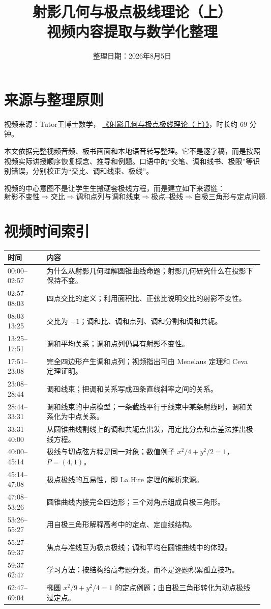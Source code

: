 \documentclass[UTF8,11pt]{ctexart}
\title{射影几何与极点极线理论（上）\\视频内容提取与数学化整理}
\author{}
\date{整理日期：2026年8月5日}
\begin{document}
\maketitle

\section*{来源与整理原则}

\noindent 视频来源：Tutor王博士数学，
\href{https://www.bilibili.com/video/BV1Me411o7ku}
{《射影几何与极点极线理论（上）》}，时长约 $69$ 分钟。

本文依据完整视频音频、板书画面和本地语音转写整理。它不是逐字稿，而是按照视频实际讲授顺序恢复概念、推导和例题。口语中的“交笔、调和线书、极限”等识别错误，分别校正为“交比、调和线束、极线”。

视频的中心意图不是让学生生搬硬套极线方程，而是建立如下来源链：
\[
\boxed{\text{射影不变性}}
\Longrightarrow
\boxed{\text{交比}}
\Longrightarrow
\boxed{\text{调和点列与调和线束}}
\Longrightarrow
\boxed{\text{极点--极线}}
\Longrightarrow
\boxed{\text{自极三角形与定点问题}}.
\]

\section{视频时间索引}

\begin{longtable}{>{\ttfamily\small}p{2.7cm}p{11.0cm}}
\toprule
时间 & 内容 \\
\midrule
00:00--02:57 & 为什么从射影几何理解圆锥曲线命题；射影几何研究什么在投影下保持不变。\\
02:57--08:03 & 四点交比的定义；利用面积比、正弦比说明交比的射影不变性。\\
08:03--13:25 & 交比为 $-1$；调和比、调和点列、调和分割和调和共轭。\\
13:25--17:51 & 调和平均关系；调和点列仍具有射影不变性。\\
17:51--23:08 & 完全四边形产生调和点列；视频指出可由 Menelaus 定理和 Ceva 定理证明。\\
23:08--28:44 & 调和线束；把调和关系写成四条直线斜率之间的关系。\\
28:44--33:31 & 调和线束的中点模型；一条截线平行于线束中某条射线时，调和关系化为中点关系。\\
33:31--40:00 & 从圆锥曲线割线上的调和共轭点出发，用定比分点和点差法推出极线方程。\\
40:00--45:14 & 极线与切点弦方程是同一对象；数值例子 $x^2/4+y^2/2=1$，$P=(4,1)$。\\
45:14--47:08 & 极点极线的互易性，即 La Hire 定理的解析来源。\\
47:08--53:26 & 圆锥曲线内接完全四边形；三个对角点组成自极三角形。\\
53:26--55:27 & 用自极三角形解释高考中的定点、定直线结构。\\
55:27--59:37 & 焦点与准线互为极点极线；调和平均在圆锥曲线中的体现。\\
59:37--62:47 & 学习方法：按结构给高考题分类，而不是逐题积累孤立技巧。\\
62:47--69:04 & 椭圆 $x^2/9+y^2/4=1$ 的定点例题；由自极三角形转化为动点极线过定点。\\
\bottomrule
\end{longtable}
\end{document}
